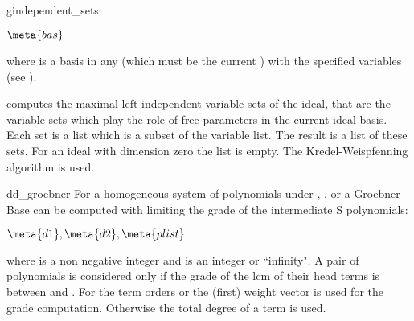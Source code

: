 \begin{Operator}{gindependent\_sets}
\begin{Syntax}

  \(\meta{bas}\)

\end{Syntax}
where  is a  basis in any  
(which must be the current ) with the specified
variables (see ). 


 computes the maximal
left independent variable sets of the ideal, that are 
the variable sets which play the role of free parameters in the
current ideal basis. Each set is a list which is a subset of the
variable list. The result is a list of these sets. For an
ideal with dimension zero the list is empty.
The Kredel-Weispfenning algorithm is used.
\end{Operator}


\begin{Operator}{dd_groebner}
For a homogeneous system of polynomials under 
, , 
or  
a Groebner Base can be computed with limiting the grade
of the intermediate S polynomials: 
\begin{Syntax}
\(\meta{d1},\meta{d2},\meta{plist}\)
\end{Syntax}
where  is a non negative integer and  is an integer
or ``infinity". A pair of polynomials is considered
only if the grade of the lcm of their head terms is between
 and .
For the term orders  or  the (first) weight
vector is used for the grade computation. Otherwise the total
degree of a term is used.
\end{Operator}




